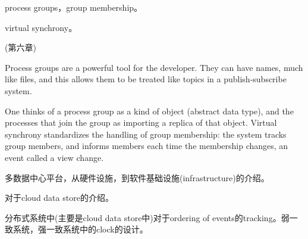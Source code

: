 \documentclass[UTF8]{ctexrep}
\newcommand{\mybreak}{\vspace{1cm}}
\begin{document}
\mybreak

process groups，group membership。

virtual synchrony。

\cite{Bost10} (第六章)

Process groups are a powerful tool for the developer. They can have names, much like files, and this allows them to be treated like topics in a publish-subscribe system. 

One thinks of a process group as a kind of object (abstract data type), and the processes that join the group as importing a replica of that object. Virtual synchrony standardizes the handling of group membership: the system tracks group members, and informs members each time the membership changes, an event called a view change.


\mybreak

\cite{Barroso18}

多数据中心平台，从硬件设施，到软件基础设施(infrastructure)的介绍。


\mybreak

\cite{Bravo15}

对于cloud data store的介绍。

分布式系统中(主要是cloud data store中)对于ordering of events的tracking。弱一致系统，强一致系统中的clock的设计。



%



\end{document}
